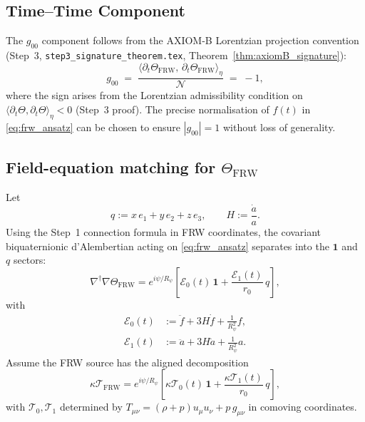 \documentclass[12pt,a4paper]{article}
\theoremstyle{definition}
\theoremstyle{remark}
\begin{document}
\subsection{Time–Time Component}

The $g_{00}$ component follows from the AXIOM-B Lorentzian projection convention
(Step~3, \texttt{step3\_signature\_theorem.tex}, Theorem~\ref{thm:axiomB_signature}):
\begin{equation}
  g_{00}
  \;=\;
  \frac{\langle\partial_t\Theta_{\mathrm{FRW}},\,\partial_t\Theta_{\mathrm{FRW}}\rangle_\eta}
       {\mathcal{N}}
  \;=\;-1,
\end{equation}
where the sign arises from the Lorentzian admissibility condition on
$\langle\partial_t\Theta,\partial_t\Theta\rangle_\eta < 0$ (Step~3 proof).
The precise normalisation of $f(t)$ in \eqref{eq:frw_ansatz}
can be chosen to ensure $|g_{00}|=1$ without loss of generality.

\subsection{Field-equation matching for $\Theta_{\mathrm{FRW}}$}

Let
\begin{equation}
  q := x\,e_1 + y\,e_2 + z\,e_3,
  \qquad
  H := \frac{\dot a}{a}.
\end{equation}
Using the Step~1 connection formula in FRW coordinates, the covariant
biquaternionic d'Alembertian acting on \eqref{eq:frw_ansatz} separates into
the $\mathbf{1}$ and $q$ sectors:
\begin{equation}
  \label{eq:frw_reduced_operator}
  \nabla^\dagger\nabla\Theta_{\mathrm{FRW}}
  =
  e^{i\psi/R_\psi}\!\left[
    \mathcal{E}_0(t)\,\mathbf{1}
    +
    \frac{\mathcal{E}_1(t)}{r_0}\,q
  \right],
\end{equation}
with
\begin{align}
  \label{eq:E0}
  \mathcal{E}_0(t) &:= \ddot f + 3H\dot f + \frac{1}{R_\psi^2}f,\\
  \label{eq:E1}
  \mathcal{E}_1(t) &:= \ddot a + 3H\dot a + \frac{1}{R_\psi^2}a.
\end{align}
Assume the FRW source has the aligned decomposition
\begin{equation}
  \label{eq:Tfrw_decomposition}
  \kappa\mathcal{T}_{\mathrm{FRW}}
  =
  e^{i\psi/R_\psi}\!\left[
    \kappa\mathcal{T}_0(t)\,\mathbf{1}
    +
    \frac{\kappa\mathcal{T}_1(t)}{r_0}\,q
  \right],
\end{equation}
with $\mathcal{T}_0,\mathcal{T}_1$ determined by
$T_{\mu\nu}=(\rho+p)u_\mu u_\nu + p\,g_{\mu\nu}$ in comoving coordinates.
\end{document}
